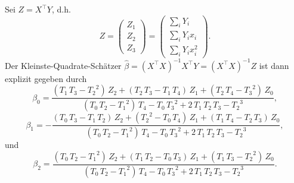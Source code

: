 Sei $Z = X^\top Y$, d.h.\
\begin{equation}
    Z = \left(
    \begin{array}{c}
        Z_1 \\ Z_2 \\ Z_3
    \end{array}
    \right) = \left(
    \begin{array}{c}
        \sum_{i}^{} Y_i \\ \sum_{i}^{} Y_i x_i \\ \sum_{i} Y_i x_i^2
    \end{array}
    \right).
\end{equation}
Der Kleinste-Quadrate-Schätzer 
$\hat \beta = \left( X^\top X \right)^{-1} X^\top Y = \left( X^\top X \right)^{-1} Z$ ist dann explizit
gegeben durch
\begin{equation}
    \beta_0 = 
\frac{\left({ T_1}\,{ T_3}-{ T_2}^2\right)\,{ Z_2}+
 \left({ T_2}\,{ T_3}-{ T_1}\,{ T_4}\right)\,{ Z_1}+
 \left({ T_2}\,{ T_4}-{ T_3}^2\right)\,{ Z_0}}{
 \left({ T_0}\,{ T_2}-{ T_1}^2\right)\,{ T_4}-{ T_0}\,
 { T_3}^2+2\,{ T_1}\,{ T_2}\,{ T_3}-{ T_2}^3},
\end{equation}
\begin{equation}
    \beta_1 = 
-  \frac{\left({ T_0}\,{ T_3}-{ T_1}\,{ T_2}\right)\,
 { Z_2}+\left({ T_2}^2-{ T_0}\,{ T_4}\right)\,{ Z_1}+
 \left({ T_1}\,{ T_4}-{ T_2}\,{ T_3}\right)\,{ Z_0}
 }{\left({ T_0}\,{ T_2}-{ T_1}^2\right)\,{ T_4}-
 { T_0}\,{ T_3}^2+2\,{ T_1}\,{ T_2}\,{ T_3}-{ T_2}^
 3},
\end{equation}
und
\begin{equation}
    \beta_2 = 
 \frac{\left({ T_0}\,{ T_2}-{ T_1}^2\right)\,{ Z_2}+
 \left({ T_1}\,{ T_2}-{ T_0}\,{ T_3}\right)\,{ Z_1}+
 \left({ T_1}\,{ T_3}-{ T_2}^2\right)\,{ Z_0}}{
 \left({ T_0}\,{ T_2}-{ T_1}^2\right)\,{ T_4}-{ T_0}\,
 { T_3}^2+2\,{ T_1}\,{ T_2}\,{ T_3}-{ T_2}^3}.
\end{equation}

